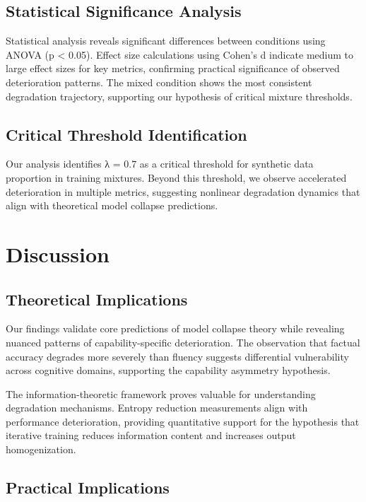 \documentclass{article}
\begin{document}
\subsection{Statistical Significance Analysis}

Statistical analysis reveals significant differences between conditions using ANOVA (p < 0.05). Effect size calculations using Cohen's d indicate medium to large effect sizes for key metrics, confirming practical significance of observed deterioration patterns. The mixed condition shows the most consistent degradation trajectory, supporting our hypothesis of critical mixture thresholds.

\subsection{Critical Threshold Identification}

Our analysis identifies λ = 0.7 as a critical threshold for synthetic data proportion in training mixtures. Beyond this threshold, we observe accelerated deterioration in multiple metrics, suggesting nonlinear degradation dynamics that align with theoretical model collapse predictions.

\section{Discussion}

\subsection{Theoretical Implications}

Our findings validate core predictions of model collapse theory while revealing nuanced patterns of capability-specific deterioration. The observation that factual accuracy degrades more severely than fluency suggests differential vulnerability across cognitive domains, supporting the capability asymmetry hypothesis.

The information-theoretic framework proves valuable for understanding degradation mechanisms. Entropy reduction measurements align with performance deterioration, providing quantitative support for the hypothesis that iterative training reduces information content and increases output homogenization.

\subsection{Practical Implications}
\end{document}
